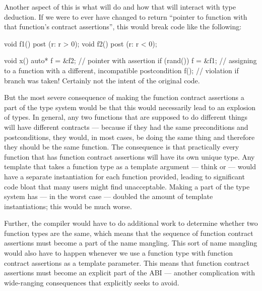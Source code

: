 Another aspect of this is what  will do and how that will interact with type deduction. If we were to ever have  changed to return ``pointer to function with that function's contract assertions'', this would break code like the following:
\begin{codeblock}
void f1() post (r: r > 0);
void f2() post (r: r < 0);

void x() {
  auto* f = &f2;   // pointer with assertion 
  if (rand()) {
    f = &f1;  // assigning to a function with a different, incompatible postcondition
  }
  f();  // violation if branch was taken! Certainly not the intent of the original code.
}
\end{codeblock}
But the most severe consequence of making the function contract assertions a part of the type system would be that this would necessarily lead to an explosion of types. In general, any two functions that are supposed to do different things will have different contracts --- because if they had the same preconditions and postconditions, they would, in most cases, be doing the same thing and therefore they should be the same function. The consequence is that practically every function that has function contract assertions will have its own unique type. Any template that takes a function type as a template argument --- think  or  --- would have a separate instantiation for each function provided, leading to significant code bloat that many users might find unacceptable. Making  a part of the type system has --- in the worst case --- doubled the amount of template instantiations; this would be much worse.

Further, the compiler would have to do additional work to determine whether two function types are the same, which means that the sequence of function contract assertions must become a part of the name mangling. This sort of name mangling would also have to happen whenever we use a function type with function contract assertions as a template parameter. This means that function contract assertions must become an explicit part of the ABI --- another complication with wide-ranging consequences that \cite{P2900R7} explicitly seeks to avoid.

